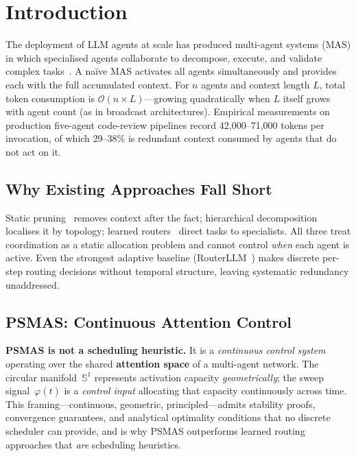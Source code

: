 \documentclass[10pt,twocolumn]{article}
\theoremstyle{plain}
\theoremstyle{definition}
\theoremstyle{remark}
\newcommand{\sweep}{\varphi}
\newcommand{\Sone}{\mathbb{S}^1}
\begin{document}
\section{Introduction}
\label{sec:intro}

The deployment of LLM agents at scale has produced multi-agent systems
(MAS) in which specialised agents collaborate to decompose, execute, and
validate complex tasks~\citep{wu2023autogen,hong2023metagpt,chase2024langgraph}.
A na\"ive MAS activates all agents simultaneously and provides each with
the full accumulated context.  For $n$ agents and context length $L$,
total token consumption is $\mathcal{O}(n{\times}L)$---growing
quadratically when $L$ itself grows with agent count (as in broadcast
architectures).  Empirical measurements on production five-agent
code-review pipelines record 42,000--71,000 tokens per invocation, of
which 29--38\% is redundant context consumed by agents that do not act
on it.

\subsection{Why Existing Approaches Fall Short}

Static pruning~\citep{liu2023lost} removes context after the fact;
hierarchical decomposition~\citep{hong2023metagpt} localises it by
topology; learned routers~\citep{shen2024hugginggpt,ong2024routerllm}
direct tasks to specialists.  All three treat coordination as a static
allocation problem and cannot control \emph{when} each agent is active.
Even the strongest adaptive baseline (RouterLLM~\citep{ong2024routerllm})
makes discrete per-step routing decisions without temporal structure,
leaving systematic redundancy unaddressed.

\subsection{PSMAS: Continuous Attention Control}

\begin{tcolorbox}[insight={Core Thesis --- Control Not Scheduling}]
\textbf{PSMAS is not a scheduling heuristic.}  It is a
\emph{continuous control system} operating over the shared
\textbf{attention space} of a multi-agent network.
The circular manifold~$\Sone$ represents activation capacity
\emph{geometrically}; the sweep signal~$\sweep(t)$ is a
\emph{control input} allocating that capacity continuously across time.
This framing---continuous, geometric, principled---admits
stability proofs, convergence guarantees, and analytical
optimality conditions that no discrete scheduler can provide,
and is why PSMAS outperforms learned routing approaches that
\emph{are} scheduling heuristics.
\end{tcolorbox}
\end{document}
